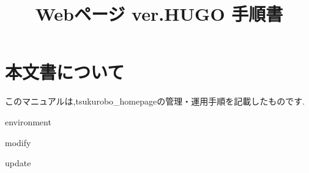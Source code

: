 \documentclass[dvipdfmx]{jsarticle}
\title{Webページ ver.HUGO 手順書}
\author{}
\begin{document}
\maketitle

\newpage
\setcounter{tocdepth}{3}
\setcounter{secnumdepth}{3}
\tableofcontents


\newpage
\section{本文書について}
このマニュアルは,tsukurobo\_homepageの管理・運用手順を記載したものです.

{environment}

\newpage
{modify}

\newpage
{update}
\end{document}
